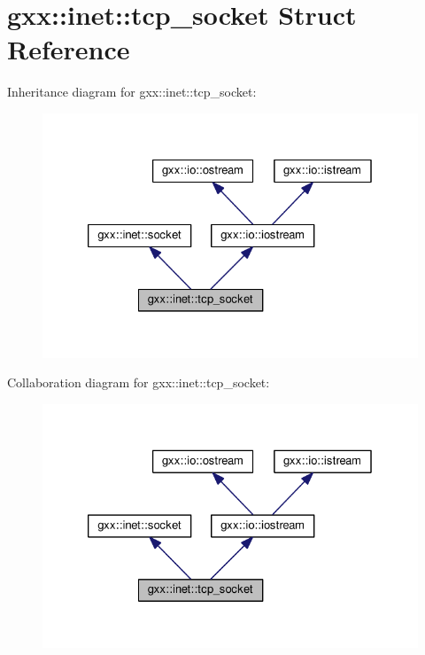 \hypertarget{structgxx_1_1inet_1_1tcp__socket}{}\section{gxx\+:\+:inet\+:\+:tcp\+\_\+socket Struct Reference}
\label{structgxx_1_1inet_1_1tcp__socket}


Inheritance diagram for gxx\+:\+:inet\+:\+:tcp\+\_\+socket\+:
\nopagebreak
\begin{figure}[H]
\begin{center}
\leavevmode
\includegraphics[width=326pt]{structgxx_1_1inet_1_1tcp__socket__inherit__graph}
\end{center}
\end{figure}


Collaboration diagram for gxx\+:\+:inet\+:\+:tcp\+\_\+socket\+:
\nopagebreak
\begin{figure}[H]
\begin{center}
\leavevmode
\includegraphics[width=326pt]{structgxx_1_1inet_1_1tcp__socket__coll__graph}
\end{center}
\end{figure}
